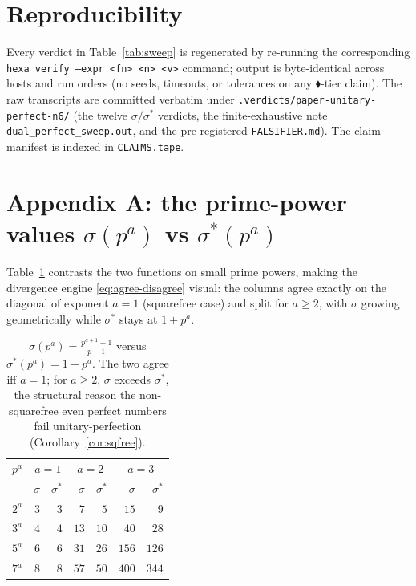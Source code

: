 \documentclass[11pt,a4paper]{article}
\newcommand{\sig}{\sigma}
\newcommand{\sigs}{\sigma^{*}}
\newcommand{\formal}{\textcolor{blue!60!black}{$\blacklozenge$}}
\theoremstyle{plain}
\theoremstyle{definition}
\begin{document}
\section*{Reproducibility}

Every verdict in Table~\ref{tab:sweep} is regenerated by re-running the
corresponding \texttt{hexa verify --expr <fn> <n> <v>} command; output is
byte-identical across hosts and run orders (no seeds, timeouts, or tolerances on
any \formal-tier claim). The raw transcripts are committed verbatim under
\texttt{.verdicts/paper-unitary-perfect-n6/} (the twelve $\sig/\sigs$ verdicts,
the finite-exhaustive note \texttt{dual\_perfect\_sweep.out}, and the
pre-registered \texttt{FALSIFIER.md}). The claim manifest is indexed in
\texttt{CLAIMS.tape}.

\appendix

\section{Appendix A: the prime-power values $\sig(p^a)$ vs $\sigs(p^a)$}
\label{sec:ppvals}

Table~\ref{tab:pp} contrasts the two functions on small prime powers, making
the divergence engine \eqref{eq:agree-disagree} visual: the columns agree
exactly on the diagonal of exponent $a=1$ (squarefree case) and split for
$a\ge2$, with $\sig$ growing geometrically while $\sigs$ stays at $1+p^a$.

\begin{table}[h]
\centering
\caption{$\sig(p^a)=\tfrac{p^{a+1}-1}{p-1}$ versus $\sigs(p^a)=1+p^a$. The two
agree iff $a=1$; for $a\ge2$, $\sig$ exceeds $\sigs$, the structural reason the
non-squarefree even perfect numbers fail unitary-perfection
(Corollary~\ref{cor:sqfree}).}
\label{tab:pp}
\begin{tabular}{r rr rr rr}
\toprule
$p^a$ & \multicolumn{2}{c}{$a=1$} & \multicolumn{2}{c}{$a=2$} & \multicolumn{2}{c}{$a=3$}\\
      & $\sig$ & $\sigs$ & $\sig$ & $\sigs$ & $\sig$ & $\sigs$\\
\midrule
$2^a$ & $3$  & $3$  & $7$  & $5$  & $15$ & $9$\\
$3^a$ & $4$  & $4$  & $13$ & $10$ & $40$ & $28$\\
$5^a$ & $6$  & $6$  & $31$ & $26$ & $156$& $126$\\
$7^a$ & $8$  & $8$  & $57$ & $50$ & $400$& $344$\\
\bottomrule
\end{tabular}
\end{table}
\end{document}
